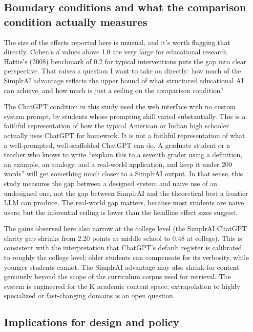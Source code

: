 \documentclass[11pt,letterpaper]{article}
\begin{document}
\subsection{Boundary conditions and what the comparison condition actually measures}

The size of the effects reported here is unusual, and it's worth flagging that
directly. Cohen's $d$ values
above 1.0 are very large for educational research. Hattie's (2008) benchmark
of 0.2 for typical interventions puts the gap into clear
perspective. That raises a question I want to take on directly: how much of the
SimplrAI advantage reflects the upper bound of what structured educational AI
can achieve, and how much is just a ceiling on the comparison condition?

The ChatGPT condition in this study used the web interface with no custom
system prompt, by students whose prompting skill varied substantially. This is
a faithful representation of how the typical American or Indian high schooler
actually uses ChatGPT for homework. It is not a faithful representation of what
a well-prompted, well-scaffolded ChatGPT can do. A graduate student or a teacher
who knows to write ``explain this to a seventh grader using a definition, an
example, an analogy, and a real-world application, and keep it under 200 words''
will get something much closer to a SimplrAI output. In that sense, this study
measures the gap between a designed system and naive use of an undesigned one,
not the gap between SimplrAI and the theoretical best a frontier
LLM can produce. The real-world gap matters, because most students are naive
users; but the inferential ceiling is lower than the headline effect sizes
suggest.

The gains observed here also narrow at the college level (the SimplrAI\textendash
ChatGPT clarity gap shrinks from 2.20 points at middle school to 0.48 at
college). This is consistent with the interpretation that ChatGPT's default
register is calibrated to roughly the college level; older students can
compensate for its verbosity, while younger students cannot. The SimplrAI
advantage may also shrink for content genuinely beyond the scope of the
curriculum corpus used for retrieval. The system is engineered for the
K academic content space; extrapolation to highly specialized
or fast-changing domains is an open question.

\subsection{Implications for design and policy}
\end{document}
